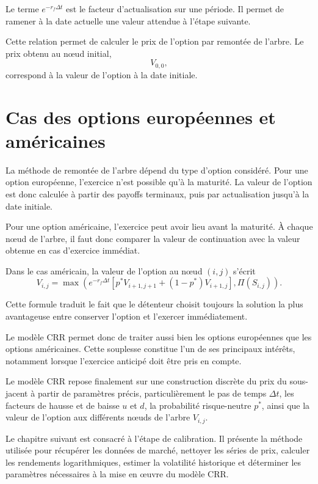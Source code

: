 \documentclass[11pt]{report}
\begin{document}
Le terme $e^{-r_f\Delta t}$ est le facteur d'actualisation sur une période. Il permet de ramener à la date actuelle une valeur attendue à l'étape suivante.

Cette relation permet de calculer le prix de l'option par remontée de l'arbre. Le prix obtenu au nœud initial,
\[
V_{0,0},
\]
correspond à la valeur de l'option à la date initiale.

\section{Cas des options européennes et américaines}

La méthode de remontée de l'arbre dépend du type d'option considéré. Pour une option européenne, l'exercice n'est possible qu'à la maturité. La valeur de l'option est donc calculée à partir des payoffs terminaux, puis par actualisation jusqu'à la date initiale.

Pour une option américaine, l'exercice peut avoir lieu avant la maturité. À chaque nœud de l'arbre, il faut donc comparer la valeur de continuation avec la valeur obtenue en cas d'exercice immédiat.

Dans le cas américain, la valeur de l'option au nœud $(i,j)$ s'écrit
\[
V_{i,j}
=
\max\left(
e^{-r_f\Delta t}
\left[
p^*V_{i+1,j+1}
+
(1-p^*)V_{i+1,j}
\right],
\Pi(S_{i,j})
\right).
\]

Cette formule traduit le fait que le détenteur choisit toujours la solution la plus avantageuse entre conserver l'option et l'exercer immédiatement.

Le modèle CRR permet donc de traiter aussi bien les options européennes que les options américaines. Cette souplesse constitue l'un de ses principaux intérêts, notamment lorsque l'exercice anticipé doit être pris en compte.

Le modèle CRR repose finalement sur une construction discrète du prix du sous-jacent à partir de paramètres précis, particulièrement le pas de temps $\Delta t$, les facteurs de hausse et de baisse $u$ et $d$, la probabilité risque-neutre $p^*$, ainsi que la valeur de l'option aux différents nœuds de l'arbre $V_{i,j}$.

Le chapitre suivant est consacré à l'étape de calibration. Il présente la méthode utilisée pour récupérer les données de marché, nettoyer les séries de prix, calculer les rendements logarithmiques, estimer la volatilité historique et déterminer les paramètres nécessaires à la mise en œuvre du modèle CRR.
\end{document}
